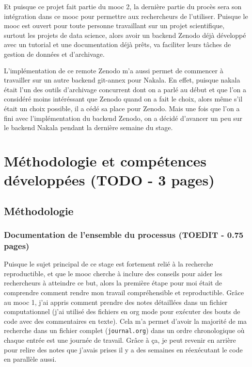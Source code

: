 \documentclass[11pt]{article}
\begin{document}
Et puisque ce projet fait partie du mooc 2, la dernière partie du
procès sera son intégration dans ce mooc pour permettre aux
rechercheurs de l'utiliser. Puisque le mooc est ouvert pour toute
personne travaillant sur un projet scientifique, surtout les projets
de data science, alors avoir un backend Zenodo déjà développé avec un
tutorial et une documentation déjà prêts, va faciliter leurs tâches de
gestion de données et d'archivage.

L'implémentation de ce remote Zenodo m'a aussi permet de commencer à
travailler sur un autre backend git-annex pour Nakala. En effet,
puisque nakala était l'un des outils d'archivage concurrent dont on a
parlé au début et que l'on a considéré moins intéréssant que Zenodo
quand on a fait le choix, alors même s'il était un choix possible, il
a cédé sa place pour Zenodo. Mais une fois que l'on a fini avec
l'implémentation du backend Zenodo, on a décidé d'avancer un peu sur
le backend Nakala pendant la dernière semaine du stage. 

\section{Méthodologie et compétences développées (TODO - 3 pages)}
\label{sec:org79675ce}
\subsection{Méthodologie}
\label{sec:org399fe83}
\subsubsection{Documentation de l'ensemble du processus (TOEDIT - 0.75 pages)}
\label{sec:org687a5c4}
Puisque le sujet principal de ce stage est fortement relié à la
recherche reproductible, et que le mooc cherche à inclure des conseils
pour aider les rechercheurs à atteindre ce but, alors la première
étape pour moi était de comprendre comment rendre mon travail
compréhensible et reproductible. Grâce au mooc 1, j'ai appris comment
prendre des notes détaillées dans un fichier computationnel (j'ai
utilisé des fichiers en org mode pour exécuter des bouts de code avec
des commentaires en texte). Cela m'a permet d'avoir la majorité de ma
recherche dans un fichier complet (\texttt{journal.org}) dans un ordre
chronologique où chaque entrée est une journée de travail. Grâce à ça,
je peut revenir en arrière pour relire des notes que j'avais prises
il y a des semaines en réexécutant le code en parallèle aussi.
\end{document}
